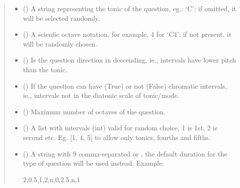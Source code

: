 \documentclass[letterpaper,10pt,english]{sphinxmanual}
\begin{document}
\begin{fulllineitems}
\begin{fulllineitems}
\begin{quote}
\begin{description}
\begin{itemize}
\item {} 
 () \textendash{} A string representing the tonic of the question,
eg.: ‘C’; if omitted, it will be selected randomly.

\item {} 
 () \textendash{} A scienfic octave notation, for example, 4 for ‘C4’;
if not present, it will be randomly chosen.

\item {} 
 () \textendash{} Is the question direction in descending, ie.,
intervals have lower pitch than the tonic.

\item {} 
 () \textendash{} If the question can have (True) or not (False)
chromatic intervals, ie., intervals not in the diatonic scale
of tonic/mode.

\item {} 
 () \textendash{} Maximum number of octaves of the question.

\item {} 
 () \textendash{} A list with intervals (int) valid for
random choice, 1 is 1st, 2 is second etc. Eg. {[}1, 4, 5{]} to
allow only tonics, fourths and fifths.

\item {} 
 () \textendash{} 
A string with 9 comma-separated  or
, the
default duration for the type of question will be used instead.
Example:

\begin{sphinxVerbatim}[commandchars=\\\{\}]
\PYGZdq{}2,0.5,1,2,n,0,2.5,n,1\PYGZdq{}
\end{sphinxVerbatim}



\end{itemize}
\end{description}
\end{quote}
\end{fulllineitems}
\end{fulllineitems}
\end{document}
